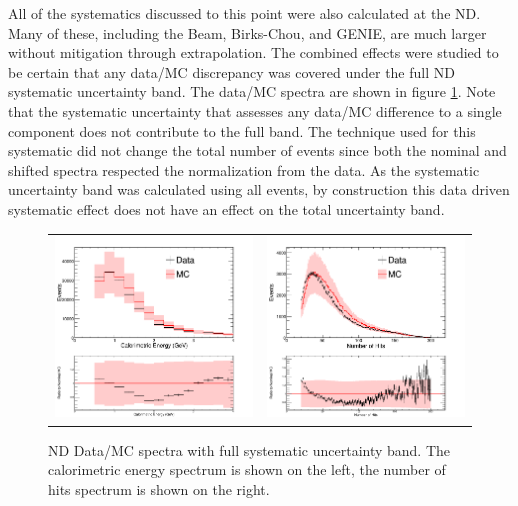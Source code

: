 All of the systematics discussed to this point were also calculated at the ND. Many of these, including the Beam, Birks-Chou, and GENIE, are much larger without mitigation through extrapolation. The combined effects were studied to be certain that any data/MC discrepancy was covered under the full ND systematic uncertainty band. The data/MC spectra are shown in figure \ref{fig:NDSystBand}. Note that the systematic uncertainty that assesses any data/MC difference to a single component does not contribute to the full band. The technique used for this systematic did not change the total number of events since both the nominal and shifted spectra respected the normalization from the data. As the systematic uncertainty band was calculated using all events, by construction this data driven systematic effect does not have an effect on the total uncertainty band.
\begin{figure}[htb]
  \centering
  \begin{tabular}{c c}
    \includegraphics[width=.44\textwidth]{figures/Systs/cCalENDAll.png} &
    \includegraphics[width=.44\textwidth]{figures/Systs/cNHitNDAll.png} \\
  \end{tabular}
  \caption[ND Data/MC Spectra with Systematics]{ND Data/MC spectra with full systematic uncertainty band. The calorimetric energy spectrum is shown on the left, the number of hits spectrum is shown on the right.}
  \label{fig:NDSystBand}
\end{figure}

